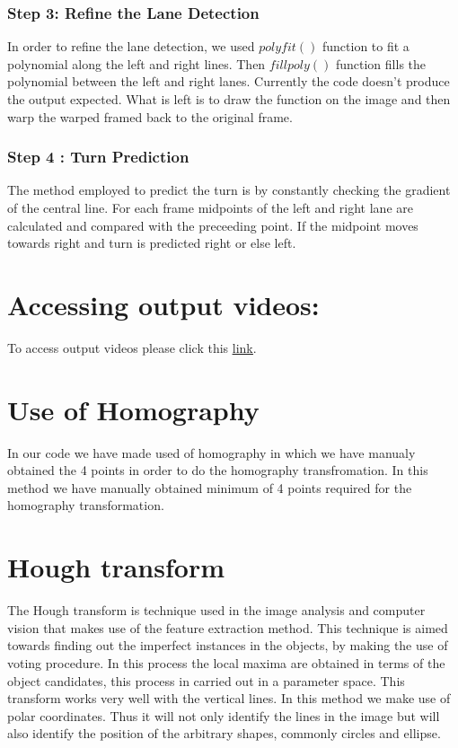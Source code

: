 \documentclass[12pt]{article}
\begin{document}
\subsubsection{Step 3: Reﬁne the Lane Detection }
In order to refine the lane detection, we used $polyfit()$ function to fit a polynomial along the left and right lines. Then $fillpoly()$ function fills the polynomial between the left and right lanes. Currently the code doesn't produce 
the output expected. What is left is to draw the function on the image and then warp the warped framed back to the original 
frame. 

\subsubsection{Step 4 : Turn Prediction }
The method employed to predict the turn is by constantly checking the gradient of the central line. For each frame midpoints of the left and right lane are calculated and compared with the preceeding point. If the midpoint moves towards right and turn is predicted right or else left.

\section{Accessing output videos:}
To access output videos please click this \href{https://drive.google.com/drive/folders/1RHnAOEJLBZfpro_NCbA1NLVsmmTDlfqJ?usp=sharing}{\underline{link}}.
\section{Use of Homography}

In our code we have made used of homography in which we have manualy obtained the 4 points in order to do the homography transfromation. In this method we have manually obtained minimum of 4 points required for the homography transformation.   

\section{ Hough transform}
The Hough transform is technique used in the image analysis and computer vision that makes use of the feature extraction method. This technique is aimed towards finding out the imperfect instances in the objects, by making the use of voting procedure. In this process the local maxima are obtained in  terms of the object candidates, this process in carried out in a parameter space.
 This transform works very well with the vertical lines. In this method we make use of polar coordinates. Thus it will not only identify the lines in the image but will also identify the position of the arbitrary shapes, commonly circles and ellipse.
 
\end{document}

